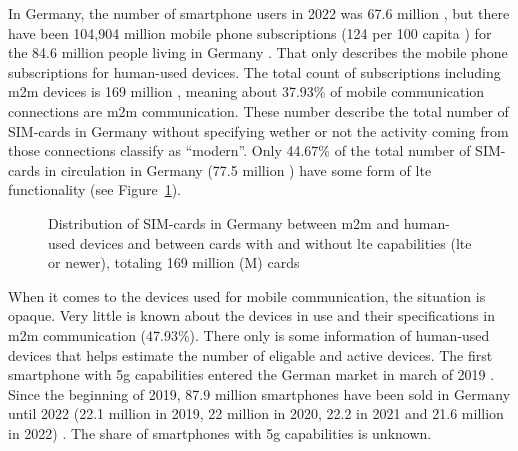 \documentclass[11pt,a4paper]{article}
\begin{document}
In Germany, the number of smartphone users in 2022 was 67.6 million \citep{smartphonenutzerDeutschland}, but there have been 104,904 million mobile phone subscriptions (124 per 100 capita \citep{mobilesubscriptionsDeutschland}) for the 84.6 million people living in Germany \citep{consensusDE2022}.
That only describes the mobile phone subscriptions for human-used devices.
The total count of subscriptions including \acrshort{m2m} devices is 169 million \citep{totalmobilesubscriptionsDeutschland}, meaning about 37.93\% of mobile communication connections are \acrshort{m2m} communication.
These number describe the total number of SIM-cards in Germany without specifying wether or not the activity coming from those connections classify as \enquote{modern}.
Only 44.67\% of the total number of SIM-cards in circulation in Germany (77.5 million \citep{simCardsDeutschland}) have some form of \acrshort{lte} functionality (see Figure~\ref{fig:simdistribution}).

\begin{figure}[t]


  \caption{Distribution of SIM-cards in Germany between \acrlong*{m2m} and human-used devices and between cards with and without \acrshort{lte} capabilities (\acrshort{lte} or newer), totaling 169 million (M) cards}
  \label{fig:simdistribution}
\end{figure}

When it comes to the devices used for mobile communication, the situation is opaque.
Very little is known about the devices in use and their specifications in \acrshort{m2m} communication (47.93\%).
There only is some information of human-used devices that helps estimate the number of eligable and active devices.
The first smartphone with \acrshort{5g} capabilities entered the German market in march of 2019 \citep{smartphonemodells5G}.
Since the beginning of 2019, 87.9 million smartphones have been sold in Germany until 2022 (22.1 million in 2019, 22 million in 2020, 22.2 in 2021 and 21.6 million in 2022) \citep{smartphonenutzungDeutschland}.
The share of smartphones with \acrshort{5g} capabilities is unknown.
\end{document}
